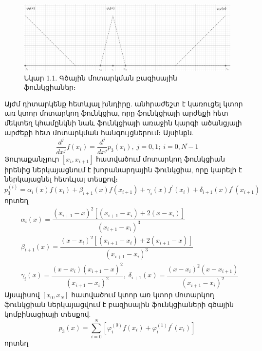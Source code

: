 \documentclass[fleqn, bachelor,subf,12pt,notitlepage]{article}
\begin{document}
\begin{figure}[H]
\centering
\includegraphics[width=1.0\textwidth]{images/one_var_linear}
\captionsetup{labelformat=empty}
\caption{Նկար 1.1. Գծային մոտարկման բազիսային ֆունկցիաներ։}
\end{figure}
Այժմ դիտարկենք հետևյալ խնդիրը. անհրաժեշտ է կառուցել  կտոր առ կտոր մոտարկող ֆունկցիա, որը ֆունկցիայի արժեքի հետ մեկտեղ կհամընկնի նաև ֆունկցիայի առաջին կարգի ածանցյալի արժեքի հետ մոտարկման հանգույցներում։ Այսինքն.
\begin{equation}
\dfrac{d^{j}}{dx^j}f(x_{i})=\dfrac{d^{j}}{dx^j}p_{3}(x_{i}),   \; j=0, 1;  \; i=\overline{0, N-1}
\end{equation}
Յուրաքանչյուր $\left[x_{i}, x_{i+1}\right]$ հատվածում մոտարկող ֆունկցիան իրենից ներկայացնում է խորանարդային ֆունկցիա, որը կարելի է ներկայացնել հետևյալ տեսքով։
\begin{equation}
p_{3}^{\left(i\right)} = \alpha_{i}(x)f(x_{i})+\beta_{i+1}(x)f(x_{i+1})+\gamma_{i}(x)f^{'}(x_{i})+\delta_{i+1}(x)f^{'}(x_{i+1})
\end{equation}
որտեղ 
\begin{equation}
\begin{aligned}
&\alpha_{i}(x)=\dfrac{\left(x_{i+1}-x\right)^{2}\left[\left(x_{i+1}-x_{i}\right)+2\left(x-x_{i}\right)\right]}{\left(x_{i+1}-x_{i}\right)^{3}}\\
&\beta_{i+1}(x)=\dfrac{\left(x-x_{i}\right)^{2}\left[\left(x_{i+1}-x_{i}\right)+2\left(x_{i+1}-x\right)\right]}{\left(x_{i+1}-x_{i}\right)^{3}}\\
&\gamma_{i}(x)=\dfrac{\left(x-x_{i}\right)\left(x_{i+1}-x\right)^{2}}{\left(x_{i+1}-x_{i}\right)^{2}}, \; \delta_{i+1}(x)=\dfrac{\left(x-x_{i}\right)^2\left(x-x_{i+1}\right)}{\left(x_{i+1}-x_{i}\right)^{2}}
\end{aligned}
\end{equation}
Այսպիսով $\left[x_{0}, x_{N}\right]$ հատվածում կտոր առ կտոր մոտարկող ֆունկցիան ներկայացվում է բազիսային ֆունկցիաների գծային կոմբինացիայի տեսքով.
\begin{equation}
p_{3}(x)=\sum_{i=0}^{N}\left[\varphi_{i}^{(0)}f(x_{i})+\varphi_{i}^{(1)}f^{'}(x_{i})\right]
\end{equation}
որտեղ 
\end{document}
